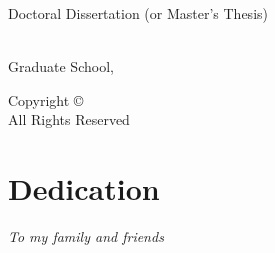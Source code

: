 \begin{titlepage}
    \thispagestyle{empty}
    \begin{center}			
        \vspace*{0cm}  %
        
        {\sffamily \large Doctoral Dissertation (or Master's Thesis)\par}
        
        \vspace*{1cm}
        
        {\LARGE\bfseries \thesistitle\par}
        
        \vspace{2cm}			
        
        {\large	\department\\ Graduate School, \university\par}
            
        \vspace{1cm}
            
        {\Large\bfseries \thesisauthor\par}
            
        \vfill
    
        {\large \submissiondate\par}
    
        \vspace{1cm}
    \end{center}		
\end{titlepage}

\newpage
\thispagestyle{empty}
\vspace*{\fill}
\begin{center}
    Copyright \copyright\ \the\year\ \thesisauthor\\
    All Rights Reserved
\end{center}
\vspace*{\fill}

\newpage
\chapter*{Dedication}
\thispagestyle{empty}
\vspace*{\fill}
\begin{center}
    \textit{To my family and friends}
\end{center}
\vspace*{\fill}